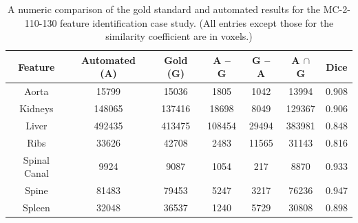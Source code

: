 \begin{table}[p]
\begin{center}
\begin{tabular}{c|cccccc}
\footnotesize \textbf{Feature} & \footnotesize \textbf{Automated (A)} & \footnotesize \textbf{Gold (G)} & \footnotesize \textbf{A -- G} & \footnotesize \textbf{G -- A} & \footnotesize \textbf{A $\cap$ G} & \footnotesize \textbf{Dice} \\
\hline
\footnotesize Aorta & \footnotesize 15799 & \footnotesize 15036 & \footnotesize 1805 & \footnotesize 1042 & \footnotesize 13994 & \footnotesize 0.908 \\
\footnotesize Kidneys & \footnotesize 148065 & \footnotesize 137416 & \footnotesize 18698 & \footnotesize 8049 & \footnotesize 129367 & \footnotesize 0.906 \\
\footnotesize Liver & \footnotesize 492435 & \footnotesize 413475 & \footnotesize 108454 & \footnotesize 29494 & \footnotesize 383981 & \footnotesize 0.848 \\
\footnotesize Ribs & \footnotesize 33626 & \footnotesize 42708 & \footnotesize 2483 & \footnotesize 11565 & \footnotesize 31143 & \footnotesize 0.816 \\
\footnotesize Spinal Canal & \footnotesize 9924 & \footnotesize 9087 & \footnotesize 1054 & \footnotesize 217 & \footnotesize 8870 & \footnotesize 0.933 \\
\footnotesize Spine & \footnotesize 81483 & \footnotesize 79453 & \footnotesize 5247 & \footnotesize 3217 & \footnotesize 76236 & \footnotesize 0.947 \\
\footnotesize Spleen & \footnotesize 32048 & \footnotesize 36537 & \footnotesize 1240 & \footnotesize 5729 & \footnotesize 30808 & \footnotesize 0.898 \\
\end{tabular}
\end{center}
\caption{A numeric comparison of the gold standard and automated results for the MC-2-110-130 feature identification case study. (All entries except those for the similarity coefficient are in voxels.)}
\label{tbl:validation-MC-2-110-130}
\end{table}


